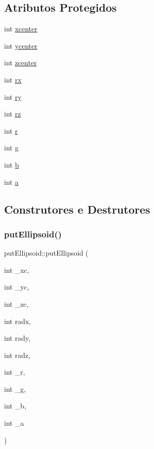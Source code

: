 \subsection*{Atributos Protegidos}
\begin{DoxyCompactItemize}
\item 
int \mbox{\hyperlink{classput_ellipsoid_a6740de00c98f9b510d92c65f628fe559}{xcenter}}
\item 
int \mbox{\hyperlink{classput_ellipsoid_adb01d95e70b45ce240ce16d76ebcfb71}{ycenter}}
\item 
int \mbox{\hyperlink{classput_ellipsoid_a54a37ce969af959213d510b1d438c388}{zcenter}}
\item 
int \mbox{\hyperlink{classput_ellipsoid_a370dd56d175e9f649ba0a01dd2168b3c}{rx}}
\item 
int \mbox{\hyperlink{classput_ellipsoid_a2ed03df07d48f241ee87a24bf880a49f}{ry}}
\item 
int \mbox{\hyperlink{classput_ellipsoid_a7bf933fe66a12b54cd39f91ebb969029}{rz}}
\item 
int \mbox{\hyperlink{classput_ellipsoid_a5000e5851d03427b37da3dfc1669005d}{r}}
\item 
int \mbox{\hyperlink{classput_ellipsoid_acc89adc037762f7d1a7b0d7b113dcae3}{g}}
\item 
int \mbox{\hyperlink{classput_ellipsoid_aa77df9dbfcc094e4aec395c43535de98}{b}}
\item 
int \mbox{\hyperlink{classput_ellipsoid_a3c6d179a11a776abc2d836f1573e141b}{a}}
\end{DoxyCompactItemize}


\subsection{Construtores e Destrutores}
\mbox{\label{classput_ellipsoid_ad548e1b569dbf04a00e0ad8b0cac5672}} 
\subsubsection{\texorpdfstring{putEllipsoid()}{putEllipsoid()}}
{\footnotesize\ttfamily put\+Ellipsoid\+::put\+Ellipsoid (\begin{DoxyParamCaption}\item[{int}]{\+\_\+xc,  }\item[{int}]{\+\_\+yc,  }\item[{int}]{\+\_\+zc,  }\item[{int}]{radx,  }\item[{int}]{rady,  }\item[{int}]{radz,  }\item[{int}]{\+\_\+r,  }\item[{int}]{\+\_\+g,  }\item[{int}]{\+\_\+b,  }\item[{int}]{\+\_\+a }\end{DoxyParamCaption})}


